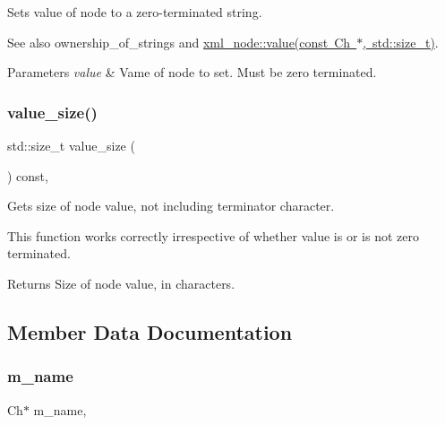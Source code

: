 Sets value of node to a zero-\/terminated string. 

See also ownership\+\_\+of\+\_\+strings and \mbox{\hyperlink{classrapidxml_1_1xml__base_ad9640aa3f5374673cb72a5289b6c91eb}{xml\+\_\+node\+::value(const Ch $\ast$, std\+::size\+\_\+t)}}. 
\begin{DoxyParams}{Parameters}
{\em value} & Vame of node to set. Must be zero terminated. \\
\hline
\end{DoxyParams}
\mbox{\label{classrapidxml_1_1xml__base_aa6981b3244607ea4ae7634f74f25361b}} 
\subsubsection{\texorpdfstring{value\+\_\+size()}{value\_size()}}
{\footnotesize\ttfamily std\+::size\+\_\+t value\+\_\+size (\begin{DoxyParamCaption}{ }\end{DoxyParamCaption}) const\hspace{0.3cm}{\ttfamily [inline]}, {\ttfamily [inherited]}}



Gets size of node value, not including terminator character. 

This function works correctly irrespective of whether value is or is not zero terminated. \begin{DoxyReturn}{Returns}
Size of node value, in characters. 
\end{DoxyReturn}


\subsection{Member Data Documentation}
\mbox{\label{classrapidxml_1_1xml__base_a23053aafada985ece680d52694c63cdc}} 
\subsubsection{\texorpdfstring{m\+\_\+name}{m\_name}}
{\footnotesize\ttfamily Ch$\ast$ m\+\_\+name\hspace{0.3cm}{\ttfamily [protected]}, {\ttfamily [inherited]}}

